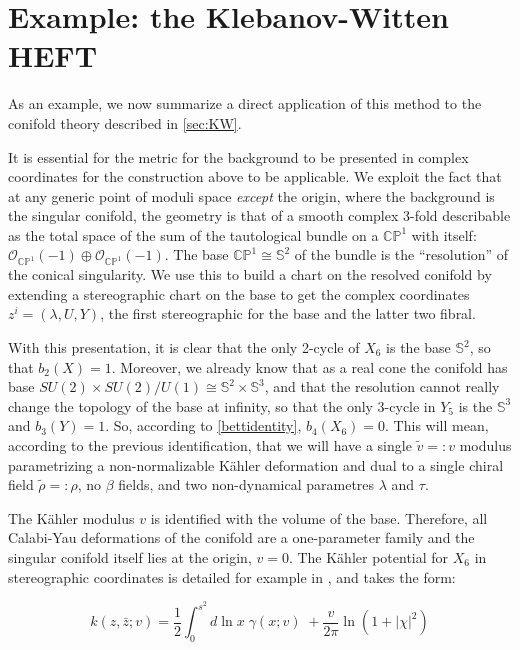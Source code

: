 \section{Example: the Klebanov-Witten HEFT}

As an example, we now summarize a direct application of this method to the conifold theory described in \eqref{sec:KW}.

It is essential for the metric for the background to be presented in complex coordinates for the construction above to be applicable. We exploit the fact that at any generic point of moduli space \emph{except} the origin, where the background is the singular conifold, the geometry is that of a smooth complex 3-fold describable as the total space of the sum of the tautological bundle on a $\mathbb{CP}^1$ with itself: $\mathcal{O}_{\mathbb{CP}^1}(-1) \oplus \mathcal{O}_{\mathbb{CP}^1}(-1)$. The base $\mathbb{CP}^1 \cong \mathbb{S}^2$ of the bundle is the ``resolution'' of the conical singularity. We use this to build a chart on the resolved conifold by extending a stereographic chart on the base to get the complex coordinates $z^i = (\lambda, U, Y)$, the first stereographic for the base and the latter two fibral.

With this presentation, it is clear that the only 2-cycle of $X_6$ is the base $\mathbb{S}^2$, so that $b_2(X) = 1$. Moreover, we already know that as a real cone the conifold has base $SU(2)\times SU(2) / U(1) \cong \mathbb{S}^2 \times \mathbb{S}^3$, and that the resolution cannot really change the topology of the base at infinity, so that the only 3-cycle in $Y_5$ is the $\mathbb{S}^3$ and $b_3(Y) = 1$. So, according to \eqref{bettidentity}, $b_4(X_6) = 0$. This will mean, according to the previous identification, that we will have a single $\tilde v =: v$ modulus parametrizing a non-normalizable K\"ahler deformation and dual to a single chiral field $\tilde\rho =: \rho$, no $\beta$ fields, and two non-dynamical parametres $\lambda$ and $\tau$. 

The K\"ahler modulus $v$ is identified with the volume of the base. Therefore, all Calabi-Yau deformations of the conifold are a one-parameter family and the singular conifold itself lies at the origin, $v=0$. The K\"ahler potential for $X_6$ in stereographic coordinates is detailed for example in \cite{PandoZayas}, and takes the form:

\begin{equation}
	k(z,\bar z; v) = \frac{1}{2} \int_0^{s^2} d\ln x \; \gamma(x;v) \; + \frac{v}{2\pi} \ln(1+|\chi|^2)
	\label{}
\end{equation}

